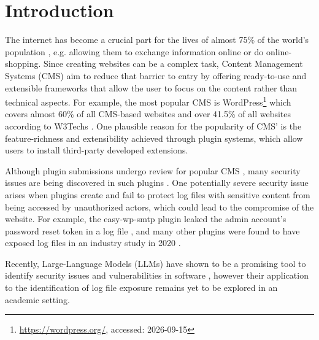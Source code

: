 \documentclass[sigconf]{acmart}
\begin{document}


\maketitle

\section{Introduction}\label{sec:introduction}
The internet has become a crucial part for the lives of almost 75\% of the world's population \cite{itu2025internetusers}, e.g. allowing them to exchange information online or do online-shopping. 
Since creating websites can be a complex task, Content Management Systems (CMS) aim to reduce that barrier to entry by offering ready-to-use and extensible frameworks that allow the user to focus on the content rather than technical aspects. 
For example, the most popular CMS is WordPress\footnote{\url{https://wordpress.org/}, accessed: 2026-09-15} which covers almost 60\% of all CMS-based websites and over 41.5\% of all websites according to W3Techs \cite{w3techs2026cms}.
One plausible reason for the popularity  of CMS' is the feature-richness and extensibility achieved through plugin systems, which allow users to install third-party developed extensions. 

Although plugin submissions undergo review for popular CMS \cite{wordpressYourPlugin,joomlaSubmittingExtension,wixAboutDistribution}, many security issues are being discovered in such plugins \cite{wpscan2026statistics,joomlaVulnerableExtensions}. 
One potentially severe security issue arises when plugins create and fail to protect log files with sensitive content from being accessed by unauthorized actors, which could lead to the compromise of the website.
For example, the easy-wp-smtp plugin leaked the admin account's password reset token in a log file \cite{easywpsmtp0day}, and many other plugins were found to have exposed log files in an industry study in 2020 \cite{detectifyWordpressPlugins}.

Recently, Large-Language Models (LLMs) have shown to be a promising tool to identify security issues and vulnerabilities in software \cite{anthropicProjectGlasswing,LU2024112031,guo2024outside,du2024vul,cao2024realvul,fang2024llmagentsautonomouslyexploit}, however their application to the identification of log file exposure remains yet to be explored in an academic setting.
\end{document}
